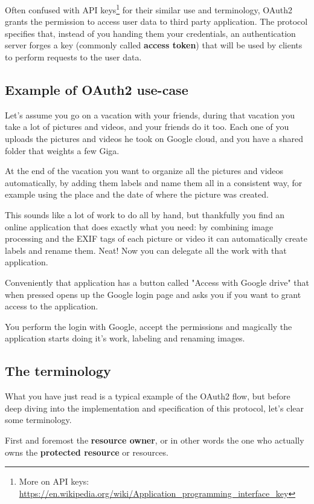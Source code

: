 \documentclass[11pt]{style}
\begin{document}
Often confused with API
keys\footnote{More on API keys:
\url{https://en.wikipedia.org/wiki/Application\_programming\_interface\_key}}
for their similar use and terminology, OAuth2 grants the permission to access
user data to third party application.
The protocol specifies that, instead of you handing them your credentials, an
authentication server forges a key (commonly called \textbf{access token}) that
will be used by clients to perform requests to the user data.

\subsection{Example of OAuth2 use-case}

Let's assume you go on a vacation with your friends, during that vacation you
take a lot of pictures and videos, and your friends do it too.
Each one of you uploads the pictures and videos he took on Google cloud, and
you have a shared folder that weights a few Giga.

At the end of the vacation you want to organize all the pictures and videos
automatically, by adding them labels and name them all in a consistent way, for
example using the place and the date of where the picture was created.

This sounds like a lot of work to do all by hand, but thankfully you find an
online application that does exactly what you need: by combining image
processing and the EXIF tags of each picture or video it can automatically
create labels and rename them. Neat! Now you can delegate all the work with that
application.

Conveniently that application has a button called "Access with Google drive"
that when pressed opens up the Google login page and asks you if you want to
grant access to the application.

You perform the login with Google, accept the permissions and magically the
application starts doing it's work, labeling and renaming images.

\subsection{The terminology}
What you have just read is a typical example of the OAuth2 flow, but before deep
diving into the implementation and specification of this protocol, let's clear
some terminology.

First and foremost the \textbf{resource owner}, or in other words the one who
actually owns the \textbf{protected resource} or resources.
\end{document}
